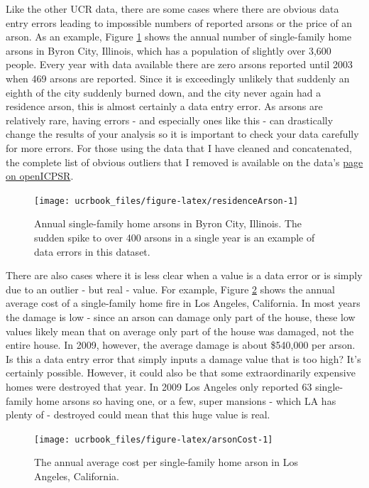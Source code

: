 \documentclass[
  12pt,
  openany]{book}
\begin{document}
Like the other UCR data, there are some cases where there are obvious data entry errors leading to impossible numbers of reported arsons or the price of an arson. As an example, Figure \ref{fig:residenceArson} shows the annual number of single-family home arsons in Byron City, Illinois, which has a population of slightly over 3,600 people. Every year with data available there are zero arsons reported until 2003 when 469 arsons are reported. Since it is exceedingly unlikely that suddenly an eighth of the city suddenly burned down, and the city never again had a residence arson, this is almost certainly a data entry error. As arsons are relatively rare, having errors - and especially ones like this - can drastically change the results of your analysis so it is important to check your data carefully for more errors. For those using the data that I have cleaned and concatenated, the complete list of obvious outliers that I removed is available on the data's \href{https://www.openicpsr.org/openicpsr/project/103540/version/V9/view}{page on openICPSR}.

\begin{figure}

{\centering \texttt{[image: ucrbook\_files/figure-latex/residenceArson-1]} 

}

\caption{Annual single-family home arsons in Byron  City, Illinois. The sudden spike to over 400 arsons in a single year is an example of data errors in this dataset. }\label{fig:residenceArson}
\end{figure}

There are also cases where it is less clear when a value is a data error or is simply due to an outlier - but real - value. For example, Figure \ref{fig:arsonCost} shows the annual average cost of a single-family home fire in Los Angeles, California. In most years the damage is low - since an arson can damage only part of the house, these low values likely mean that on average only part of the house was damaged, not the entire house. In 2009, however, the average damage is about \$540,000 per arson. Is this a data entry error that simply inputs a damage value that is too high? It's certainly possible. However, it could also be that some extraordinarily expensive homes were destroyed that year. In 2009 Los Angeles only reported 63 single-family home arsons so having one, or a few, super mansions - which LA has plenty of - destroyed could mean that this huge value is real.

\begin{figure}

{\centering \texttt{[image: ucrbook\_files/figure-latex/arsonCost-1]} 

}

\caption{The annual average cost per single-family home arson in Los Angeles, California.}\label{fig:arsonCost}
\end{figure}

\backmatter

  
\end{document}
